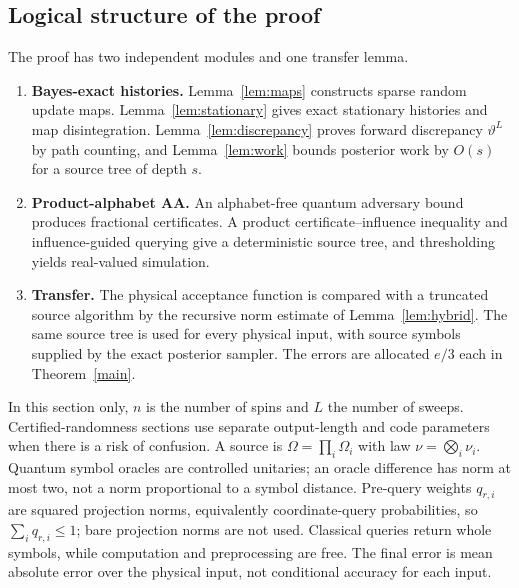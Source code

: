 \documentclass[11pt]{article}
\theoremstyle{definition}\newtheorem{definition}[theorem]{Definition}
\theoremstyle{remark}\newtheorem{remark}[theorem]{Remark}
\begin{document}
\subsection{Logical structure of the proof}
The proof has two independent modules and one transfer lemma.
\begin{enumerate}
\item \textbf{Bayes-exact histories.} Lemma~\ref{lem:maps} constructs sparse random update maps. Lemma~\ref{lem:stationary} gives exact stationary histories and map disintegration. Lemma~\ref{lem:discrepancy} proves forward discrepancy \(\vartheta^L\) by path counting, and Lemma~\ref{lem:work} bounds posterior work by \(O(s)\) for a source tree of depth \(s\).
\item \textbf{Product-alphabet AA.} An alphabet-free quantum adversary bound produces fractional certificates. A product certificate--influence inequality and influence-guided querying give a deterministic source tree, and thresholding yields real-valued simulation.
\item \textbf{Transfer.} The physical acceptance function is compared with a truncated source algorithm by the recursive norm estimate of Lemma~\ref{lem:hybrid}. The same source tree is used for every physical input, with source symbols supplied by the exact posterior sampler. The errors are allocated \(e/3\) each in Theorem~\ref{main}.
\end{enumerate}
In this section only, \(n\) is the number of spins and \(L\) the number of sweeps. Certified-randomness sections use separate output-length and code parameters when there is a risk of confusion. A source is \(\Omega=\prod_i\Omega_i\) with law \(\nu=\bigotimes_i\nu_i\). Quantum symbol oracles are controlled unitaries; an oracle difference has norm at most two, not a norm proportional to a symbol distance. Pre-query weights \(q_{r,i}\) are squared projection norms, equivalently coordinate-query probabilities, so \(\sum_iq_{r,i}\le1\); bare projection norms are not used. Classical queries return whole symbols, while computation and preprocessing are free. The final error is mean absolute error over the physical input, not conditional accuracy for each input.

\end{document}
